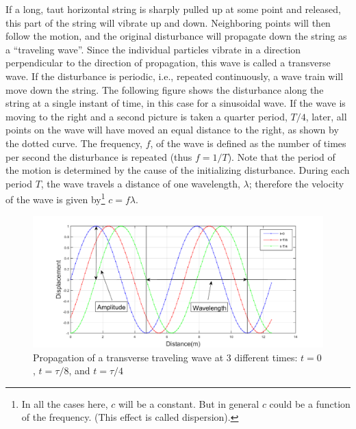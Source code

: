 If a long, taut horizontal string is sharply pulled up at some point and released, this part of the string will vibrate up and down. Neighboring points will then follow the motion, and the original disturbance will propagate down the string as a “traveling wave”. Since the individual particles vibrate in a direction perpendicular to the direction of propagation, this wave is called a transverse wave. If the disturbance is periodic, i.e., repeated continuously, a wave train will move down the string. The following figure shows the disturbance along the string at a single instant of time, in this case for a sinusoidal wave. If the wave is moving to the right and a second picture is taken a quarter period, $T/4$, later, all points on the wave will have moved an equal distance to the right, as shown by the dotted curve. The frequency, $f$, of the wave is defined as the number of times per second the disturbance is repeated (thus $f = 1 / T$). Note that the period of the motion is determined by the cause of the initializing disturbance. During each period $T$, the wave travels a distance of one wavelength, $\lambda$; therefore the velocity of the wave is given by\footnote{In all the cases here, $c$ will be a constant. But in general $c$ could be a function of the frequency. (This effect is called dispersion).} $c=f\lambda$.\myskip
\begin{figure}[h]
\centering
\includegraphics[width=1.0\textwidth]{./Exp8/pic/page01.png}
\caption{Propagation of a transverse traveling wave at 3 different times: $t=0$, $t=\tau/8$, and $t=\tau/4$}
\end{figure} 


